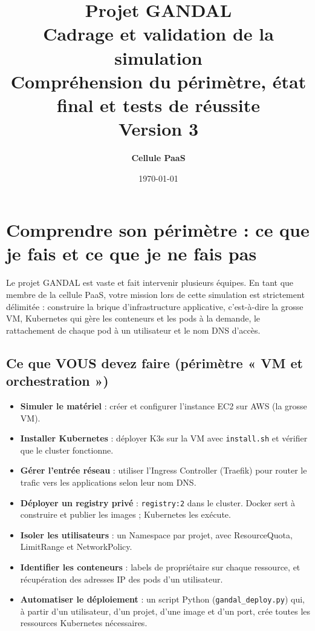 \documentclass[12pt,a4paper]{article}
\title{
    \vspace{2cm}
    \textbf{\Huge Projet GANDAL} \\
    \vspace{0.5cm}
    \Large{Cadrage et validation de la simulation} \\
    \vspace{1cm}
    \large{Compréhension du périmètre, état final et tests de réussite} \\
    \vspace{0.5cm}
    \normalsize{Version 3}
}
\author{\textbf{Cellule PaaS}}
\date{\today}
\begin{document}
\maketitle
\thispagestyle{empty}
\newpage

\tableofcontents
\newpage

\section{Comprendre son périmètre : ce que je fais et ce que je ne fais pas}

Le projet GANDAL est vaste et fait intervenir plusieurs équipes. En tant que membre de la cellule PaaS, votre mission lors de cette simulation est strictement délimitée : construire la brique d'infrastructure applicative, c'est-à-dire la grosse VM, Kubernetes qui gère les conteneurs et les pods à la demande, le rattachement de chaque pod à un utilisateur et le nom DNS d'accès.

\subsection{Ce que VOUS devez faire (périmètre « VM et orchestration »)}
\begin{itemize}
    \item \textbf{Simuler le matériel} : créer et configurer l'instance EC2 sur AWS (la grosse VM).
    \item \textbf{Installer Kubernetes} : déployer K3s sur la VM avec \texttt{install.sh} et vérifier que le cluster fonctionne.
    \item \textbf{Gérer l'entrée réseau} : utiliser l'Ingress Controller (Traefik) pour router le trafic vers les applications selon leur nom DNS.
    \item \textbf{Déployer un registry privé} : \nolinkurl{registry:2} dans le cluster. Docker sert à construire et publier les images ; Kubernetes les exécute.
    \item \textbf{Isoler les utilisateurs} : un Namespace par projet, avec ResourceQuota, LimitRange et NetworkPolicy.
    \item \textbf{Identifier les conteneurs} : labels de propriétaire sur chaque ressource, et récupération des adresses IP des pods d'un utilisateur.
    \item \textbf{Automatiser le déploiement} : un script Python (\texttt{gandal\_deploy.py}) qui, à partir d'un utilisateur, d'un projet, d'une image et d'un port, crée toutes les ressources Kubernetes nécessaires.
\end{itemize}
\end{document}
